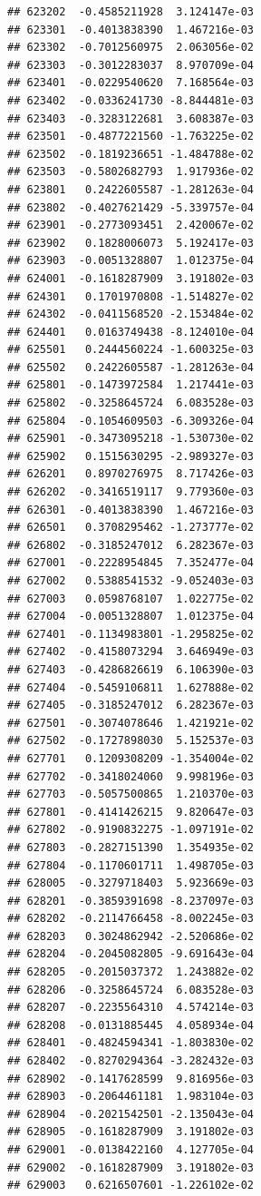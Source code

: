 \documentclass[ignorenonframetext,]{beamer}
\begin{document}
\begin{frame}[fragile]
\begin{verbatim}
## 623202  -0.4585211928  3.124147e-03
## 623301  -0.4013838390  1.467216e-03
## 623302  -0.7012560975  2.063056e-02
## 623303  -0.3012283037  8.970709e-04
## 623401  -0.0229540620  7.168564e-03
## 623402  -0.0336241730 -8.844481e-03
## 623403  -0.3283122681  3.608387e-03
## 623501  -0.4877221560 -1.763225e-02
## 623502  -0.1819236651 -1.484788e-02
## 623503  -0.5802682793  1.917936e-02
## 623801   0.2422605587 -1.281263e-04
## 623802  -0.4027621429 -5.339757e-04
## 623901  -0.2773093451  2.420067e-02
## 623902   0.1828006073  5.192417e-03
## 623903  -0.0051328807  1.012375e-04
## 624001  -0.1618287909  3.191802e-03
## 624301   0.1701970808 -1.514827e-02
## 624302  -0.0411568520 -2.153484e-02
## 624401   0.0163749438 -8.124010e-04
## 625501   0.2444560224 -1.600325e-03
## 625502   0.2422605587 -1.281263e-04
## 625801  -0.1473972584  1.217441e-03
## 625802  -0.3258645724  6.083528e-03
## 625804  -0.1054609503 -6.309326e-04
## 625901  -0.3473095218 -1.530730e-02
## 625902   0.1515630295 -2.989327e-03
## 626201   0.8970276975  8.717426e-03
## 626202  -0.3416519117  9.779360e-03
## 626301  -0.4013838390  1.467216e-03
## 626501   0.3708295462 -1.273777e-02
## 626802  -0.3185247012  6.282367e-03
## 627001  -0.2228954845  7.352477e-04
## 627002   0.5388541532 -9.052403e-03
## 627003   0.0598768107  1.022775e-02
## 627004  -0.0051328807  1.012375e-04
## 627401  -0.1134983801 -1.295825e-02
## 627402  -0.4158073294  3.646949e-03
## 627403  -0.4286826619  6.106390e-03
## 627404  -0.5459106811  1.627888e-02
## 627405  -0.3185247012  6.282367e-03
## 627501  -0.3074078646  1.421921e-02
## 627502  -0.1727898030  5.152537e-03
## 627701   0.1209308209 -1.354004e-02
## 627702  -0.3418024060  9.998196e-03
## 627703  -0.5057500865  1.210370e-03
## 627801  -0.4141426215  9.820647e-03
## 627802  -0.9190832275 -1.097191e-02
## 627803  -0.2827151390  1.354935e-02
## 627804  -0.1170601711  1.498705e-03
## 628005  -0.3279718403  5.923669e-03
## 628201  -0.3859391698 -8.237097e-03
## 628202  -0.2114766458 -8.002245e-03
## 628203   0.3024862942 -2.520686e-02
## 628204  -0.2045082805 -9.691643e-04
## 628205  -0.2015037372  1.243882e-02
## 628206  -0.3258645724  6.083528e-03
## 628207  -0.2235564310  4.574214e-03
## 628208  -0.0131885445  4.058934e-04
## 628401  -0.4824594341 -1.803830e-02
## 628402  -0.8270294364 -3.282432e-03
## 628902  -0.1417628599  9.816956e-03
## 628903  -0.2064461181  1.983104e-03
## 628904  -0.2021542501 -2.135043e-04
## 628905  -0.1618287909  3.191802e-03
## 629001  -0.0138422160  4.127705e-04
## 629002  -0.1618287909  3.191802e-03
## 629003   0.6216507601 -1.226102e-02

\end{verbatim}
\end{frame}
\end{document}
